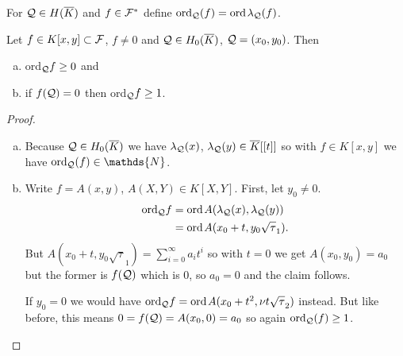\documentclass[english,11pt,a4paper]{article}
\begin{document}
\vspace{-3mm}
\fline
\vspace{-3mm}
\begin{defin}
   For $\mathcal{Q} \in H(\overline K)$ and $f \in \mathcal{F}^*$ define $\text{ord}_{\mathcal{Q}} (f) = \text{ord\hspace{0.4mm}} \lambda_{\mathcal{Q}} (f)$.
\end{defin}
\vspace{-5.5mm}
\fline


\begin{lemma}\label{one}
  Let $f \in K[x,y] \subset \mathcal{F}$, $f \neq 0$ and $\mathcal{Q} \in H_0(\overline K)$, $\mathcal{Q} = (x_0,y_0)$. Then
  \begin{enumerate}[(a)]\parskip 1mm
	  \item ord$_{\mathcal{Q}} f \geq 0$ and
	  \item if $f(\mathcal{Q}) = 0$ then ord$_{\mathcal{Q}} f \geq 1$.
	\end{enumerate}\parskip 3mm
	\begin{proof}\hfill
		\begin{enumerate}[(a)]\parskip 1mm
	  	\item Because $\mathcal{Q} \in H_0(\overline K)$ we have $\lambda_{\mathcal{Q}}(x)$, $\lambda_{\mathcal{Q}}(y) \in \overline K[[t]]$ so with $f \in K[x,y]$ we have $\ordq (f) \in \mathds{N}$.
	  	\item Write $f = A(x,y)$, $A(X,Y) \in K[X,Y]$. First, let $y_0 \neq 0$.
	  	\begin{align*}
	  	  \text{ord}_{\mathcal{Q}} f &= \text{ord\hspace{0.4mm}} A(\lambda_{\mathcal{Q}}(x), \lambda_{\mathcal{Q}}(y))\\
	  	  &= \text{ord\hspace{0.4mm}} A(x_0 + t, y_0 \sqrt \tau_1).
	  	\end{align*}
	  	But $A(x_0 + t, y_0 \sqrt \tau_1)=\sum_{i=0}^{\infty} a_i t^i$ so with $t=0$ we get $A(x_0, y_0)=a_0$ but the former is $f(\mathcal{Q})$ which is $0$, so $a_0 = 0$ and the claim follows.

	  	If $y_0 = 0$ we would have $\text{ord}_{\mathcal{Q}} f = \text{ord\hspace{0.4mm}} A(x_0 + t^2, \nu t \sqrt \tau_2)$ instead. But like before, this means $0 = f(\mathcal{Q}) = A(x_0, 0) = a_0$ so again $\text{ord}_{\mathcal{Q}} (f) \geq 1$.
		\end{enumerate}\parskip 3mm
	\end{proof}
\end{lemma}
\end{document}
